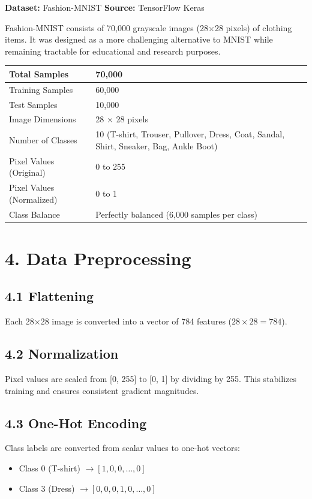 \documentclass[11pt]{article}
\begin{document}
\textbf{Dataset:} Fashion-MNIST\quad
\textbf{Source:} TensorFlow Keras

Fashion-MNIST consists of 70,000 grayscale images (28×28 pixels) of clothing items. It was designed as a more challenging alternative to MNIST while remaining tractable for educational and research purposes.

\begin{center}
\begin{tabular}{|l|l|}
\hline
Total Samples & 70,000\\ \hline
Training Samples & 60,000\\ \hline
Test Samples & 10,000\\ \hline
Image Dimensions & 28 $\times$ 28 pixels\\ \hline
Number of Classes & 10 (T-shirt, Trouser, Pullover, Dress, Coat, Sandal, Shirt, Sneaker, Bag, Ankle Boot)\\ \hline
Pixel Values (Original) & 0 to 255\\ \hline
Pixel Values (Normalized) & 0 to 1\\ \hline
Class Balance & Perfectly balanced (6,000 samples per class)\\ \hline
\end{tabular}
\end{center}

\section*{4. Data Preprocessing}

\subsection*{4.1 Flattening}
Each 28×28 image is converted into a vector of 784 features ($28 \times 28 = 784$).

\subsection*{4.2 Normalization}
Pixel values are scaled from [0, 255] to [0, 1] by dividing by 255. This stabilizes training and ensures consistent gradient magnitudes.

\subsection*{4.3 One-Hot Encoding}
Class labels are converted from scalar values to one-hot vectors:
\begin{itemize}
\item Class 0 (T-shirt) $\to [1, 0, 0, \ldots, 0]$
\item Class 3 (Dress) $\to [0, 0, 0, 1, 0, \ldots, 0]$
\end{itemize}
\end{document}
